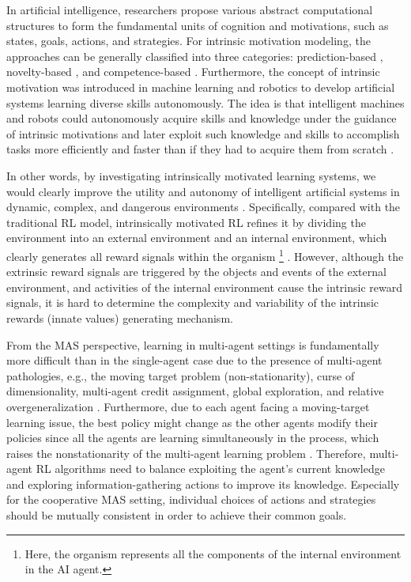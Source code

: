 \documentclass[letterpaper]{article} %
\begin{document}
In artificial intelligence, researchers propose various abstract computational structures to form the fundamental units of cognition and motivations, such as states, goals, actions, and strategies. For intrinsic motivation modeling, the approaches can be generally classified into three categories: prediction-based \cite{schmidhuber1991curious,schmidhuber2010formal}, novelty-based \cite{marsland2000real,merrick2009motivated}, and competence-based \cite{barto2004intrinsically,schembri2007evolution}. Furthermore, the concept of intrinsic motivation was introduced in machine learning and robotics to develop artificial systems learning diverse skills autonomously. The idea is that intelligent machines and robots could autonomously acquire skills and knowledge under the guidance of intrinsic motivations and later exploit such knowledge and skills to accomplish tasks more efficiently and faster than if they had to acquire them from scratch \cite{baldassarre2013intrinsically}.

In other words, by investigating intrinsically motivated learning systems, we would clearly improve the utility and autonomy of intelligent artificial systems in dynamic, complex, and dangerous environments \cite{yang2023hierarchical,yang2022game}. Specifically, compared with the traditional RL model, intrinsically motivated RL refines it by dividing the environment into an external environment and an internal environment, which clearly generates all reward signals within the organism \footnote{Here, the organism represents all the components of the internal environment in the AI agent.} \cite{baldassarre2013intrinsically}. However, although the extrinsic reward signals are triggered by the objects and events of the external environment, and activities of the internal environment cause the intrinsic reward signals, it is hard to determine the complexity and variability of the intrinsic rewards (innate values) generating mechanism.

From the MAS perspective, learning in multi-agent settings is fundamentally more difficult than in the single-agent case due to the presence of multi-agent pathologies, e.g., the moving target problem (non-stationarity), curse of dimensionality, multi-agent credit assignment, global exploration, and relative overgeneralization \cite{hernandez2019survey}. Furthermore, due to each agent facing a moving-target learning issue, the best policy might change as the other agents modify their policies since all the agents are learning simultaneously in the process, which raises the nonstationarity of the multi-agent learning problem \cite{busoniu2008comprehensive}. Therefore, multi-agent RL algorithms need to balance exploiting the agent's current knowledge and exploring information-gathering actions to improve its knowledge. Especially for the cooperative MAS setting, individual choices of actions and strategies should be mutually consistent in order to achieve their common goals.
\end{document}
